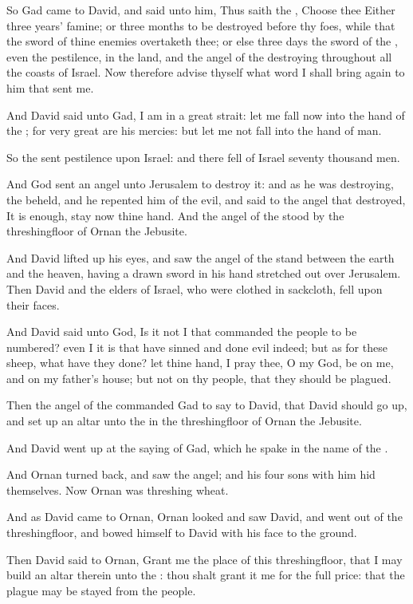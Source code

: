 \verse So Gad came to David, and said unto him, Thus saith the \LORD, Choose thee \verse Either three years' famine; or three months to be destroyed before thy foes, while that the sword of thine enemies overtaketh thee; or else three days the sword of the \LORD, even the pestilence, in the land, and the angel of the \LORD destroying throughout all the coasts of Israel. Now therefore advise thyself what word I shall bring again to him that sent me.

\verse And David said unto Gad, I am in a great strait: let me fall now into the hand of the \LORD; for very great are his mercies: but let me not fall into the hand of man.

\verse So the \LORD sent pestilence upon Israel: and there fell of Israel seventy thousand men.

\verse And God sent an angel unto Jerusalem to destroy it: and as he was destroying, the \LORD beheld, and he repented him of the evil, and said to the angel that destroyed, It is enough, stay now thine hand.  And the angel of the \LORD stood by the threshingfloor of Ornan the Jebusite.

\verse And David lifted up his eyes, and saw the angel of the \LORD stand between the earth and the heaven, having a drawn sword in his hand stretched out over Jerusalem. Then David and the elders of Israel, who were clothed in sackcloth, fell upon their faces.

\verse And David said unto God, Is it not I that commanded the people to be numbered? even I it is that have sinned and done evil indeed; but as for these sheep, what have they done? let thine hand, I pray thee, O \LORD my God, be on me, and on my father's house; but not on thy people, that they should be plagued.

\verse Then the angel of the \LORD commanded Gad to say to David, that David should go up, and set up an altar unto the \LORD in the threshingfloor of Ornan the Jebusite.

\verse And David went up at the saying of Gad, which he spake in the name of the \LORD.

\verse And Ornan turned back, and saw the angel; and his four sons with him hid themselves. Now Ornan was threshing wheat.

\verse And as David came to Ornan, Ornan looked and saw David, and went out of the threshingfloor, and bowed himself to David with his face to the ground.

\verse Then David said to Ornan, Grant me the place of this threshingfloor, that I may build an altar therein unto the \LORD: thou shalt grant it me for the full price: that the plague may be stayed from the people.

